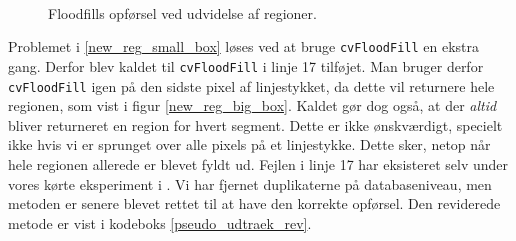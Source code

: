 {\begin{figure}[p]
    \setlength\fboxsep{0pt}
    \setlength\fboxrule{0.5pt}
    \centering
    \\
    \caption[]{
    Floodfills opførsel ved udvidelse af regioner.
    }
    \label{floodfill_return_entire_region}
\end{figure}

Problemet i \ref{new_reg_small_box} løses ved at bruge
\texttt{cvFloodFill} en ekstra gang. Derfor blev kaldet til
\texttt{cvFloodFill} i linje 17 tilføjet. Man bruger derfor
\texttt{cvFloodFill} igen på den sidste pixel af linjestykket, da dette
vil returnere hele regionen, som vist i
figur \ref{new_reg_big_box}. Kaldet gør dog også, at der \emph{altid}
bliver returneret en region for hvert segment. Dette er ikke
ønskværdigt, specielt ikke hvis vi er sprunget over alle pixels på et
linjestykke. Dette sker, netop når hele regionen allerede er blevet fyldt
ud. Fejlen i linje 17 har eksisteret selv under vores kørte eksperiment
i .
Vi har fjernet duplikaterne på databaseniveau, men metoden er senere
blevet rettet til at have den korrekte opførsel. Den reviderede metode
er vist i kodeboks \ref{pseudo_udtraek_rev}.

}
